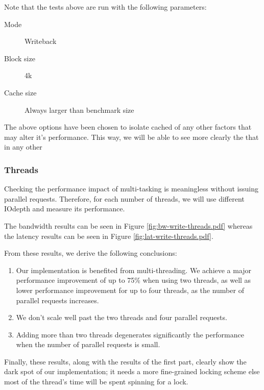 Note that the tests above are run with the following parameters:

\begin{description}
	\item[Mode] Writeback
	\item[Block size] 4k
	\item[Cache size] Always larger than benchmark size
\end{description}

The above options have been chosen to isolate cached of any other factors that 
may alter it's performance. This way, we will be able to see more clearly the   
that in any other

\subsubsection{Threads}

Checking the performance impact of multi-tasking is meaningless without issuing
parallel requests. Therefore, for each number of threads, we will use different 
IOdepth and measure its performance.

The bandwidth results can be seen in Figure \ref{fig:bw-write-threads.pdf} 
whereas the latency results can be seen in Figure 
\ref{fig:lat-write-threads.pdf}.


From these results, we derive the following conclusions:

\begin{enumerate}
	\item Our implementation is benefited from multi-threading. We achieve 
		a major performance improvement of up to 75\% when using two 
		threads, as well as lower performance improvement for up to 
		four threads, as the number of parallel requests increases.
	\item We don't scale well past the two threads and four parallel 
		requests.
	\item Adding more than two threads degenerates significantly the 
		performance when the number of parallel requests is small.
\end{enumerate}

Finally, these results, along with the results of the first part, clearly show 
the dark spot of our implementation; it needs a more fine-grained locking 
scheme else most of the thread's time will be spent spinning for a lock.

